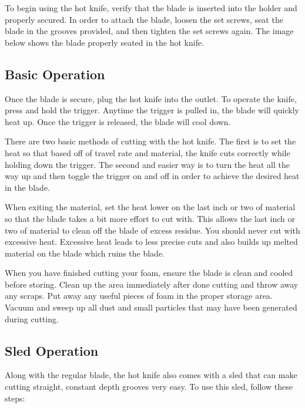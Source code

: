 To begin using the hot knife, verify that the blade is inserted into the holder and properly secured.  In order to attach the blade, loosen the set screws, seat the blade in the grooves provided, and then tighten the set screws again.  The image below shows the blade properly seated in the hot knife.


\subsection{Basic Operation}\label{hotknife_ops}
Once the blade is secure, plug the hot knife into the outlet.  To operate the knife, press and hold the trigger.  Anytime the trigger is pulled in, the blade will quickly heat up.  Once the trigger is released, the blade will cool down.

There are two basic methods of cutting with the hot knife.  The first is to set the heat so that based off of travel rate and material, the knife cuts correctly while holding down the trigger.  The second and easier way is to turn the heat all the way up and then toggle the trigger on and off in order to achieve the desired heat in the blade.

When exiting the material, set the heat lower on the last inch or two of material so that the blade takes a bit more effort to cut with. This allows the last inch or two of material to clean off the blade of excess residue.  You should never cut with excessive heat.  Excessive heat leads to less precise cuts and also builds up melted material on the blade which ruins the blade.

When you have finished cutting your foam, ensure the blade is clean and cooled before storing.  Clean up the area immediately after done cutting and throw away any scraps.  Put away any useful pieces of foam in the proper storage area.  Vacuum and sweep up all dust and small particles that may have been generated during cutting.
\subsection{Sled Operation}

Along with the regular blade, the hot knife also comes with a sled that can make cutting straight, constant depth grooves very easy.  To use this sled, follow these steps:

